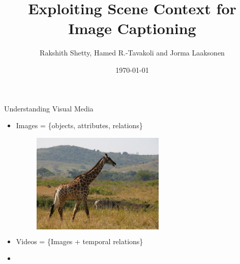 \documentclass{beamer}
\begin{document}

\title{Exploiting Scene Context for Image Captioning}
\author[Rakshith Shetty and Jorma Laaksonen]{Rakshith Shetty, Hamed R.\@-Tavakoli and Jorma Laaksonen}
\date{\today}

\frame{\titlepage} 



\begin{frame}{Understanding Visual Media}
  \begin{itemize}
  \item<1-> Images = \{objects, attributes, relations\}\\
  \begin{figure}[h]
    \begin{columns}
    \hfill\includegraphics[width=0.6\textwidth]{images/COCO_train2014_000000544856.jpg}
    \hspace{-5mm}
    \centering
    \caption{}
    \end{columns}
  \end{figure}
  \item<2->Videos = \{Images + temporal relations\}\\[4mm]
  \item<3->
  \end{itemize}
\end{frame}
\end{document}

